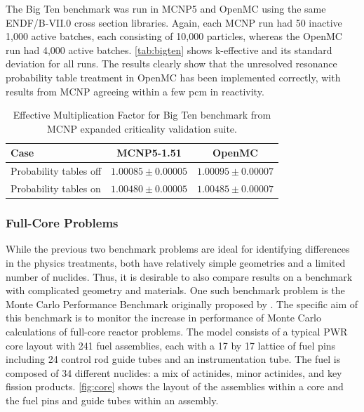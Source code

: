 \documentclass[authoryear,preprint]{elsarticle}
\begin{document}
The Big Ten benchmark was run in MCNP5 and OpenMC using the same ENDF/B-VII.0
cross section libraries. Again, each MCNP run had 50 inactive 1,000 active
batches, each consisting of 10,000 particles, whereas the OpenMC run had 4,000
active batches. \autoref{tab:bigten} shows k-effective and its standard
deviation for all runs. The results clearly show that the unresolved resonance
probability table treatment in OpenMC has been implemented correctly, with
results from MCNP agreeing within a few pcm in reactivity.

\begin{table}
  \caption{Effective Multiplication Factor for Big Ten benchmark from MCNP
    expanded criticality validation suite.}
  \label{tab:bigten}
  \begin{center}
  \begin{tabular}{ l c c }
    \hline
    Case & MCNP5-1.51 & OpenMC \\
    \hline
    Probability tables off & $1.00085 \pm 0.00005$ & $1.00095 \pm 0.00007$ \\
    Probability tables on  & $1.00480 \pm 0.00005$ & $1.00485 \pm 0.00007$ \\
    \hline
  \end{tabular}
  \end{center}
\end{table}

\subsubsection{Full-Core Problems}

While the previous two benchmark problems are ideal for identifying differences
in the physics treatments, both have relatively simple geometries and a limited
number of nuclides. Thus, it is desirable to also compare results on a benchmark
with complicated geometry and materials. One such benchmark problem is the Monte
Carlo Performance Benchmark originally proposed by \citet{hoogenboom}. The
specific aim of this benchmark is to monitor the increase in performance of
Monte Carlo calculations of full-core reactor problems. The model consists of a
typical PWR core layout with 241 fuel assemblies, each with a 17 by 17 lattice
of fuel pins including 24 control rod guide tubes and an instrumentation
tube. The fuel is composed of 34 different nuclides: a mix of actinides, minor
actinides, and key fission products. \autoref{fig:core} shows the layout of the
assemblies within a core and the fuel pins and guide tubes within an assembly.
\end{document}
